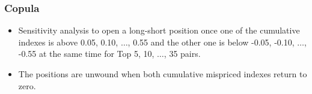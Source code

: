 \documentclass[pdf,9pt,xcolor=dvipsnames,hide notes]{beamer}
\begin{document}
\begin{frame}[label=frame4f3]
	\frametitle{Copula}
	
	
	\vspace{0.3cm}
	
	\begin{itemize}
%		
		
		\item Sensitivity analysis to open a long-short position once one of the
		cumulative indexes is above 0.05, 0.10, $\ldots$, 0.55 and the other one is below
		-0.05, -0.10, $\ldots$, -0.55 at the same time for Top 5, 10, $\ldots$, 35 pairs.
		
		
		\vspace{0.3cm}
		\pause
		
		\item The
		positions are unwound when both cumulative mispriced indexes return to zero.
		
	\end{itemize}
\end{frame}
	
\end{document}
